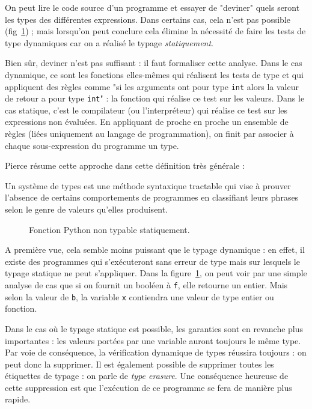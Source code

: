 
On peut lire le code source d'un programme et essayer de "deviner" quels seront
les types des différentes expressions. Dans certains cas, cela n'est pas
possible (fig~\ref{fig:nontypable}) ; mais lorsqu'on peut conclure cela élimine
la nécessité de faire les tests de type dynamiques car on a réalisé le typage
\emph{statiquement}.

Bien sûr, deviner n'est pas suffisant : il faut formaliser cette analyse. Dans
le cas dynamique, ce sont les fonctions elles-mêmes qui réalisent les tests de
type et qui appliquent des règles comme "si les arguments ont pour type
\texttt{int} alors la valeur de retour a pour type \texttt{int}" : la fonction
qui réalise ce test sur les valeurs. Dans le cas statique, c'est le compilateur
(ou l'interpréteur) qui réalise ce test sur les expressions non évaluées. En
appliquant de proche en proche un ensemble de règles (liées uniquement au
langage de programmation), on finit par associer à chaque sous-expression du
programme un type.

Pierce résume cette approche dans cette définition très générale :

\begin{definition}
Un système de types est une méthode syntaxique tractable qui vise à prouver
l'absence de certains comportements de programmes en classifiant leurs phrases
selon le genre de valeurs qu'elles produisent. \cite{TAPL}
\end{definition}

\begin{figure}
  \caption{Fonction Python non typable statiquement.}
  \label{fig:nontypable}
\end{figure}

A première vue, cela semble moins puissant que le typage dynamique : en effet,
il existe des programmes qui s'exécuteront sans erreur de type mais sur lesquels
le typage statique ne peut s'appliquer. Dans la figure~\ref{fig:nontypable}, on
peut voir par une simple analyse de cas que si on fournit un booléen à
\texttt{f}, elle retourne un entier. Mais selon la valeur de \texttt{b}, la
variable \texttt{x} contiendra une valeur de type entier ou fonction.

Dans le cas où le typage statique est possible, les garanties sont en revanche
plus importantes : les valeurs portées par une variable auront toujours le même
type. Par voie de conséquence, la vérification dynamique de types réussira
toujours : on peut donc la supprimer. Il est également possible de supprimer
toutes les étiquettes de typage : on parle de \emph{type erasure}. Une
conséquence heureuse de cette suppression est que l'exécution de ce programme se
fera de manière plus rapide.

